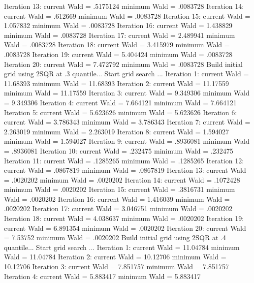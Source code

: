 Iteration    13:  current Wald =  .5175124         minimum Wald =  .0083728
Iteration    14:  current Wald =   .612669         minimum Wald =  .0083728
Iteration    15:  current Wald =  1.057832         minimum Wald =  .0083728
Iteration    16:  current Wald =  1.438829         minimum Wald =  .0083728
Iteration    17:  current Wald =  2.489941         minimum Wald =  .0083728
Iteration    18:  current Wald =  3.415979         minimum Wald =  .0083728
Iteration    19:  current Wald =  5.404424         minimum Wald =  .0083728
Iteration    20:  current Wald =  7.472792         minimum Wald =  .0083728
{\smallskip}
Build initial grid using 2SQR at .3 quantile...
{\smallskip}
Start grid search ...
Iteration     1:  current Wald =  11.68393         minimum Wald =  11.68393
Iteration     2:  current Wald =  11.17559         minimum Wald =  11.17559
Iteration     3:  current Wald =  9.349306         minimum Wald =  9.349306
Iteration     4:  current Wald =  7.664121         minimum Wald =  7.664121
Iteration     5:  current Wald =  5.623626         minimum Wald =  5.623626
Iteration     6:  current Wald =  3.786343         minimum Wald =  3.786343
Iteration     7:  current Wald =  2.263019         minimum Wald =  2.263019
Iteration     8:  current Wald =  1.594027         minimum Wald =  1.594027
Iteration     9:  current Wald =  .8936081         minimum Wald =  .8936081
Iteration    10:  current Wald =   .232475         minimum Wald =   .232475
Iteration    11:  current Wald =  .1285265         minimum Wald =  .1285265
Iteration    12:  current Wald =  .0867819         minimum Wald =  .0867819
Iteration    13:  current Wald =  .0020202         minimum Wald =  .0020202
Iteration    14:  current Wald =  .1072428         minimum Wald =  .0020202
Iteration    15:  current Wald =  .3816731         minimum Wald =  .0020202
Iteration    16:  current Wald =  1.416039         minimum Wald =  .0020202
Iteration    17:  current Wald =  3.046751         minimum Wald =  .0020202
Iteration    18:  current Wald =  4.038637         minimum Wald =  .0020202
Iteration    19:  current Wald =  6.891354         minimum Wald =  .0020202
Iteration    20:  current Wald =   7.53752         minimum Wald =  .0020202
{\smallskip}
Build initial grid using 2SQR at .4 quantile...
{\smallskip}
Start grid search ...
Iteration     1:  current Wald =  11.04784         minimum Wald =  11.04784
Iteration     2:  current Wald =  10.12706         minimum Wald =  10.12706
Iteration     3:  current Wald =  7.851757         minimum Wald =  7.851757
Iteration     4:  current Wald =  5.883417         minimum Wald =  5.883417
